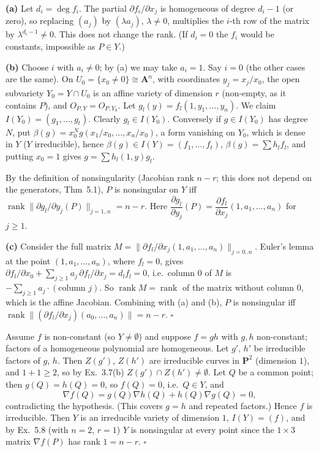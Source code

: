 \documentclass[11pt]{article}
\begin{document}
\textbf{(a)} Let $d_i=\deg f_i$. The partial $\partial f_i/\partial x_j$ is homogeneous of degree $d_i-1$ (or zero), so replacing $(a_j)$ by $(\lambda a_j)$, $\lambda\ne0$, multiplies the $i$-th row of the matrix by $\lambda^{d_i-1}\neq0$. This does not change the rank. (If $d_i=0$ the $f_i$ would be constants, impossible as $P\in Y$.)

\textbf{(b)} Choose $i$ with $a_i\ne0$; by (a) we may take $a_i=1$. Say $i=0$ (the other cases are the same). On $U_0=\{x_0\neq0\}\cong\mathbf A^n$, with coordinates $y_j=x_j/x_0$, the open subvariety $Y_0=Y\cap U_0$ is an affine variety of dimension $r$ (non-empty, as it contains $P$), and $O_{P,Y}=O_{P,Y_0}$. Let $g_l(y)=f_l(1,y_1,\dots,y_n)$. We claim $I(Y_0)=(g_1,\dots,g_t)$. Clearly $g_l\in I(Y_0)$. Conversely if $g\in I(Y_0)$ has degree $N$, put $\beta(g)=x_0^Ng(x_1/x_0,\dots,x_n/x_0)$, a form vanishing on $Y_0$, which is dense in $Y$ ($Y$ irreducible), hence $\beta(g)\in I(Y)=(f_1,\dots,f_t)$, $\beta(g)=\sum h_lf_l$, and putting $x_0=1$ gives $g=\sum h_l(1,y)g_l$.

By the definition of nonsingularity (Jacobian rank $n-r$; this does not depend on the generators, Thm~5.1), $P$ is nonsingular on $Y$ iff $\operatorname{rank}\|\partial g_l/\partial y_j(P)\|_{j=1..n}=n-r$. Here $\dfrac{\partial g_l}{\partial y_j}(P)=\dfrac{\partial f_l}{\partial x_j}(1,a_1,\dots,a_n)$ for $j\ge1$.

\textbf{(c)} Consider the full matrix $M=\|\partial f_l/\partial x_j(1,a_1,\ldots,a_n)\|_{j=0..n}$. Euler's lemma at the point $(1,a_1,\dots,a_n)$, where $f_l=0$, gives $\partial f_l/\partial x_0+\sum_{j\ge1}a_j\,\partial f_l/\partial x_j=d_lf_l=0$, i.e.\ column $0$ of $M$ is $-\sum_{j\ge1}a_j\cdot(\text{column }j)$. So $\operatorname{rank}M=\operatorname{rank}$ of the matrix without column $0$, which is the affine Jacobian. Combining with (a) and (b), $P$ is nonsingular iff $\operatorname{rank}\|(\partial f_l/\partial x_j)(a_0,\dots,a_n)\|=n-r$. \hfill$\square$

\pf
Assume $f$ is non-constant (so $Y\neq\emptyset$) and suppose $f=gh$ with $g,h$ non-constant; factors of a homogeneous polynomial are homogeneous. Let $g'$, $h'$ be irreducible factors of $g$, $h$. Then $Z(g')$, $Z(h')$ are irreducible curves in $\mathbf P^2$ (dimension $1$), and $1+1\ge2$, so by Ex.~3.7(b) $Z(g')\cap Z(h')\ne\emptyset$. Let $Q$ be a common point; then $g(Q)=h(Q)=0$, so $f(Q)=0$, i.e.\ $Q\in Y$, and
\[
\nabla f(Q)=g(Q)\nabla h(Q)+h(Q)\nabla g(Q)=0,
\]
contradicting the hypothesis. (This covers $g=h$ and repeated factors.) Hence $f$ is irreducible. Then $Y$ is an irreducible variety of dimension $1$, $I(Y)=(f)$, and by Ex.~5.8 (with $n=2$, $r=1$) $Y$ is nonsingular at every point since the $1\times3$ matrix $\nabla f(P)$ has rank $1=n-r$. \hfill$\square$
\end{document}
